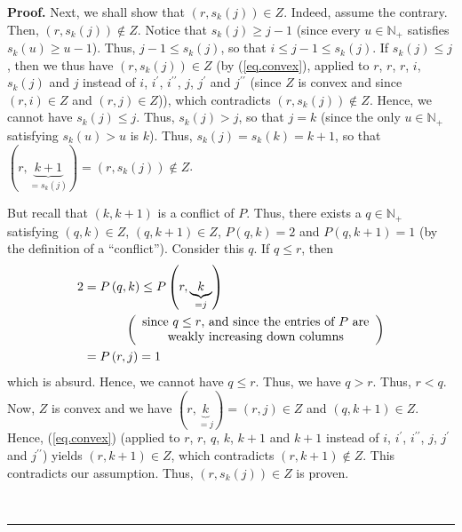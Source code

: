 \documentclass[numbers=enddot,12pt,final,onecolumn,notitlepage]{scrartcl}%
\theoremstyle{definition}
\newenvironment{proof}[1][Proof]{\noindent\textbf{#1.} }{\ \rule{0.5em}{0.5em}}
\newenvironment{verlong}{}{}
\begin{document}
\begin{verlong}
\begin{proof}
Next, we shall show that $\left(  r,s_{k}\left(  j\right)  \right)  \in Z$.
Indeed, assume the contrary. Then, $\left(  r,s_{k}\left(  j\right)  \right)
\notin Z$. Notice that $s_{k}\left(  j\right)  \geq j-1$ (since every
$u\in\mathbb{N}_{+}$ satisfies $s_{k}\left(  u\right)  \geq u-1$). Thus,
$j-1\leq s_{k}\left(  j\right)  $, so that $i\leq j-1\leq s_{k}\left(
j\right)  $. If $s_{k}\left(  j\right)  \leq j$, then we thus have $\left(
r,s_{k}\left(  j\right)  \right)  \in Z$ (by (\ref{eq.convex}), applied to
$r$, $r$, $r$, $i$, $s_{k}\left(  j\right)  $ and $j$ instead of $i$,
$i^{\prime}$, $i^{\prime\prime}$, $j$, $j^{\prime}$ and $j^{\prime\prime}$
(since $Z$ is convex and since $\left(  r,i\right)  \in Z$ and $\left(
r,j\right)  \in Z$)), which contradicts $\left(  r,s_{k}\left(  j\right)
\right)  \notin Z$. Hence, we cannot have $s_{k}\left(  j\right)  \leq j$.
Thus, $s_{k}\left(  j\right)  >j$, so that $j=k$ (since the only
$u\in\mathbb{N}_{+}$ satisfying $s_{k}\left(  u\right)  >u$ is $k$). Thus,
$s_{k}\left(  j\right)  =s_{k}\left(  k\right)  =k+1$, so that $\left(
r,\underbrace{k+1}_{=s_{k}\left(  j\right)  }\right)  =\left(  r,s_{k}\left(
j\right)  \right)  \notin Z$.

But recall that $\left(  k,k+1\right)  $ is a conflict of $P$. Thus, there
exists a $q\in\mathbb{N}_{+}$ satisfying $\left(  q,k\right)  \in Z$, $\left(
q,k+1\right)  \in Z$, $P\left(  q,k\right)  =2$ and $P\left(  q,k+1\right)
=1$ (by the definition of a \textquotedblleft conflict\textquotedblright).
Consider this $q$. If $q\leq r$, then
\begin{align*}
2  &  =P\left(  q,k\right)  \leq P\left(  r,\underbrace{k}_{=j}\right) \\
&  \ \ \ \ \ \ \ \ \ \ \left(
\begin{array}
[c]{c}%
\text{since }q\leq r\text{, and since the entries of }P\text{ are}\\
\text{weakly increasing down columns}%
\end{array}
\right) \\
&  =P\left(  r,j\right)  =1
\end{align*}
which is absurd. Hence, we cannot have $q\leq r$. Thus, we have $q>r$. Thus,
$r<q$. Now, $Z$ is convex and we have $\left(  r,\underbrace{k}_{=j}\right)
=\left(  r,j\right)  \in Z$ and $\left(  q,k+1\right)  \in Z$. Hence,
(\ref{eq.convex}) (applied to $r$, $r$, $q$, $k$, $k+1$ and $k+1$ instead of
$i$, $i^{\prime}$, $i^{\prime\prime}$, $j$, $j^{\prime}$ and $j^{\prime\prime
}$) yields $\left(  r,k+1\right)  \in Z$, which contradicts $\left(
r,k+1\right)  \notin Z$. This contradicts our assumption. Thus, $\left(
r,s_{k}\left(  j\right)  \right)  \in Z$ is proven.


\end{proof}
\end{verlong}
\end{document}
